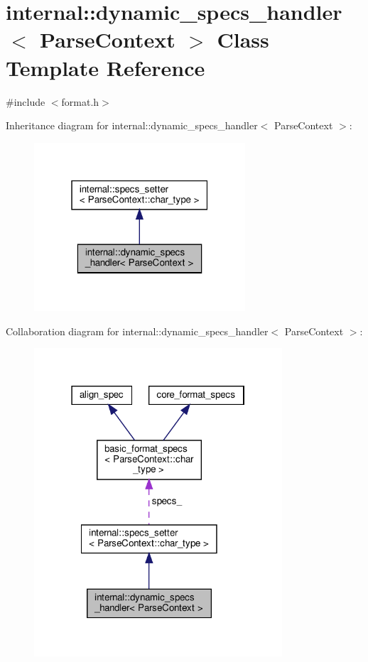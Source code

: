 \hypertarget{classinternal_1_1dynamic__specs__handler}{}\section{internal\+:\+:dynamic\+\_\+specs\+\_\+handler$<$ Parse\+Context $>$ Class Template Reference}
\label{classinternal_1_1dynamic__specs__handler}


{\ttfamily \#include $<$format.\+h$>$}



Inheritance diagram for internal\+:\+:dynamic\+\_\+specs\+\_\+handler$<$ Parse\+Context $>$\+:
\nopagebreak
\begin{figure}[H]
\begin{center}
\leavevmode
\includegraphics[width=223pt]{classinternal_1_1dynamic__specs__handler__inherit__graph}
\end{center}
\end{figure}


Collaboration diagram for internal\+:\+:dynamic\+\_\+specs\+\_\+handler$<$ Parse\+Context $>$\+:
\nopagebreak
\begin{figure}[H]
\begin{center}
\leavevmode
\includegraphics[width=262pt]{classinternal_1_1dynamic__specs__handler__coll__graph}
\end{center}
\end{figure}
